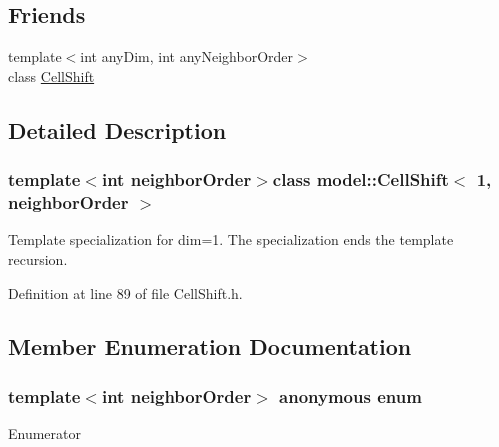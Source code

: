 \subsection*{Friends}
\begin{DoxyCompactItemize}
\item 
{\footnotesize template$<$int any\+Dim, int any\+Neighbor\+Order$>$ }\\class \hyperlink{classmodel_1_1_cell_shift_3_011_00_01neighbor_order_01_4_a710c956f234de98c0962a73bf402c186}{Cell\+Shift}
\end{DoxyCompactItemize}


\subsection{Detailed Description}
\subsubsection*{template$<$int neighbor\+Order$>$class model\+::\+Cell\+Shift$<$ 1, neighbor\+Order $>$}

Template specialization for dim=1. The specialization ends the template recursion. 

Definition at line 89 of file Cell\+Shift.\+h.



\subsection{Member Enumeration Documentation}
\hypertarget{classmodel_1_1_cell_shift_3_011_00_01neighbor_order_01_4_a3278061f7d0e6dc4cf8bfdc41c905279}{}\subsubsection[{anonymous enum}]{\setlength{\rightskip}{0pt plus 5cm}template$<$int neighbor\+Order$>$ anonymous enum}\label{classmodel_1_1_cell_shift_3_011_00_01neighbor_order_01_4_a3278061f7d0e6dc4cf8bfdc41c905279}
\begin{Desc}
\item[Enumerator]\par
\begin{description}
\item[{\em 
\hypertarget{classmodel_1_1_cell_shift_3_011_00_01neighbor_order_01_4_a3278061f7d0e6dc4cf8bfdc41c905279a7d09f043223542f703a6a3fe8eb441ae}{}dim\label{classmodel_1_1_cell_shift_3_011_00_01neighbor_order_01_4_a3278061f7d0e6dc4cf8bfdc41c905279a7d09f043223542f703a6a3fe8eb441ae}
}]\end{description}
\end{Desc}


